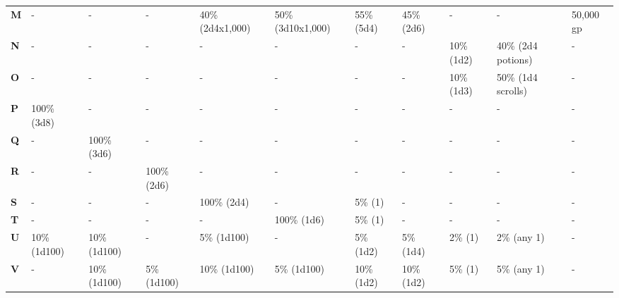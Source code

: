 \begin {table}[H]
\begin{tabularx}{\columnwidth}{>{\bfseries}M{.4in}M{.48in}M{.48in}M{.48in}M{.48in}M{.48in}M{.2in}M{.4in}M{.4in}YM{.45in}}
	M & - & - & - & 40\% (2d4x1,000) & 50\% (3d10x1,000) & 55\% (5d4) & 45\% (2d6) & - & - & 50,000 gp\\
	N & - & - & - & - & - & - & - & 10\% (1d2) & 40\% (2d4 potions) & -\\
	O & - & - & - & - & - & - & - & 10\% (1d3) & 50\% (1d4 scrolls) & -\\
	P & 100\% (3d8) & - & - & - & - & - & - & - & - & -\\
	Q & - & 100\% (3d6) & - & - & - & - & - & - & - & -\\
	R & - & - & 100\% (2d6) & - & - & - & - & - & - & -\\
	S & - & - & - & 100\% (2d4) & - & 5\% (1) & - & - & - & -\\
	T & - & - & - & - & 100\% (1d6) & 5\% (1) & - & - & - & -\\
	U & 10\% (1d100) & 10\% (1d100) & - & 5\% (1d100) & - & 5\% (1d2) & 5\% (1d4) & 2\% (1) & 2\% (any 1) & -\\
	V & - & 10\% (1d100) & 5\% (1d100) & 10\% (1d100) & 5\% (1d100) & 10\% (1d2) & 10\% (1d2) & 5\% (1) & 5\% (any 1) & -
  \end {tabularx}
\end {table}
